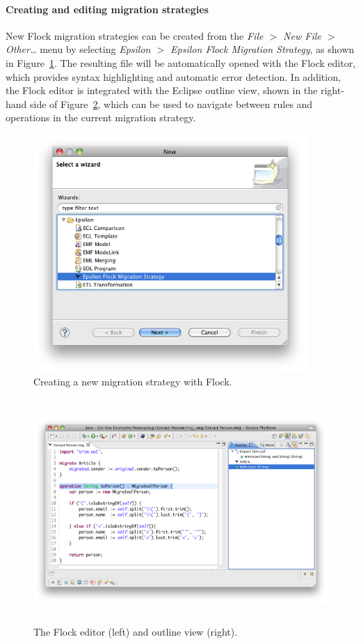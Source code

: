 \paragraph{Creating and editing migration strategies} New Flock migration strategies can be created from the \emph{File $>$ New File $>$ Other\ldots} menu by selecting \emph{Epsilon $>$ Epsilon Flock Migration Strategy}, as shown in Figure~\ref{fig:flock_new_migration_strategy}. The resulting file will be automatically opened with the Flock editor, which provides syntax highlighting and automatic error detection. In addition, the Flock editor is integrated with the Eclipse outline view, shown in the right-hand side of Figure~\ref{fig:flock_editor_and_outline_view}, which can be used to navigate between rules and operations in the current migration strategy.

\begin{figure}[tbp]
	\centering
		\includegraphics[height=9cm]{5.Implementation/images/flock_programmers_guide/new_migration_strategy.png}
	\caption{Creating a new migration strategy with Flock.}
	\label{fig:flock_new_migration_strategy}
\end{figure}


\begin{figure}[tbp]
	\centering
		\includegraphics[height=8.5cm]{5.Implementation/images/flock_programmers_guide/editor.png}
	\caption{The Flock editor (left) and outline view (right).}
	\label{fig:flock_editor_and_outline_view}
\end{figure}


